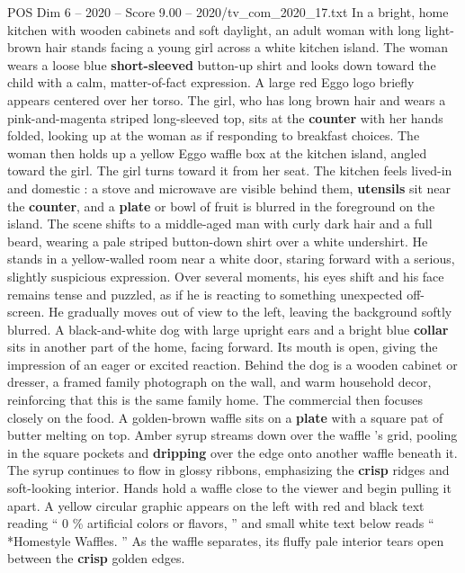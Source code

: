 \begin{textsample}{POS Dim 6 – 2020 – Score 9.00 – 2020/tv\_com\_2020\_17.txt}  \label{ex:f6_pos_062}
In a bright, home kitchen with wooden cabinets and soft daylight, an adult woman with long light-brown hair stands facing a young girl across a white kitchen island.
The woman wears a loose blue \textbf{short-sleeved} button-up shirt and looks down toward the child with a calm, matter-of-fact expression.
A large red Eggo logo briefly appears centered over her torso.
The girl, who has long brown hair and wears a pink-and-magenta striped long-sleeved top, sits at the \textbf{counter} with her hands folded, looking up at the woman as if responding to breakfast choices.
The woman then holds up a yellow Eggo waffle box at the kitchen island, angled toward the girl.
The girl turns toward it from her seat.
The kitchen feels lived-in and domestic : a stove and microwave are visible behind them, \textbf{utensils} sit near the \textbf{counter}, and a \textbf{plate} or bowl of fruit is blurred in the foreground on the island.
The scene shifts to a middle-aged man with curly dark hair and a full beard, wearing a pale striped button-down shirt over a white undershirt.
He stands in a yellow-walled room near a white door, staring forward with a serious, slightly suspicious expression.
Over several moments, his eyes shift and his face remains tense and puzzled, as if he is reacting to something unexpected off-screen.
He gradually moves out of view to the left, leaving the background softly blurred.
A black-and-white dog with large upright ears and a bright blue \textbf{collar} sits in another part of the home, facing forward.
Its mouth is open, giving the impression of an eager or excited reaction.
Behind the dog is a wooden cabinet or dresser, a framed family photograph on the wall, and warm household decor, reinforcing that this is the same family home.
The commercial then focuses closely on the food.
A golden-brown waffle sits on a \textbf{plate} with a square pat of butter melting on top.
Amber syrup streams down over the waffle ’s grid, pooling in the square pockets and \textbf{dripping} over the edge onto another waffle beneath it.
The syrup continues to flow in glossy ribbons, emphasizing the \textbf{crisp} ridges and soft-looking interior.
Hands hold a waffle close to the viewer and begin pulling it apart.
A yellow circular graphic appears on the left with red and black text reading “ 0 \% artificial colors or flavors, ” and small white text below reads “ *Homestyle Waffles. ” As the waffle separates, its fluffy pale interior tears open between the \textbf{crisp} golden edges.

\end{textsample}
